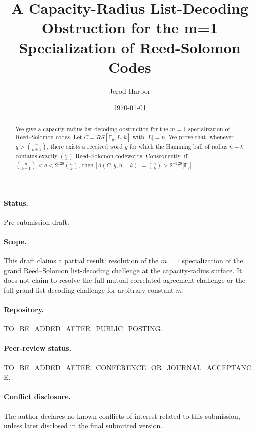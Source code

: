 \documentclass[11pt]{article}
\title{A Capacity-Radius List-Decoding Obstruction for the m=1 Specialization of Reed-Solomon Codes}
\author{Jerod Harbor}
\date{\today}
\begin{document}
\maketitle
\paragraph{Status.} Pre-submission draft.
\paragraph{Scope.} This draft claims a partial result: resolution of the \(m=1\) specialization of the grand Reed--Solomon list-decoding challenge at the capacity-radius surface. It does not claim to resolve the full mutual correlated agreement challenge or the full grand list-decoding challenge for arbitrary constant \(m\).
\paragraph{Repository.} TO\_BE\_ADDED\_AFTER\_PUBLIC\_POSTING.
\paragraph{Peer-review status.} TO\_BE\_ADDED\_AFTER\_CONFERENCE\_OR\_JOURNAL\_ACCEPTANCE.
\paragraph{Conflict disclosure.} The author declares no known conflicts of interest related to this submission, unless later disclosed in the final submitted version.
\begin{abstract}
We give a capacity-radius list-decoding obstruction for the \(m=1\) specialization of Reed--Solomon codes. Let \(C=RS[\mathbb{F}_q,L,k]\) with \(|L|=n\). We prove that, whenever \(q>\binom{n}{k+1}\), there exists a received word \(y\) for which the Hamming ball of radius \(n-k\) contains exactly \(\binom{n}{k}\) Reed--Solomon codewords. Consequently, if \(\binom{n}{k+1}<q<2^{128}\binom{n}{k}\), then \(|\Lambda(C,y,n-k)|=\binom{n}{k}>2^{-128}|\mathbb{F}_q|\).
\end{abstract}
\end{document}

